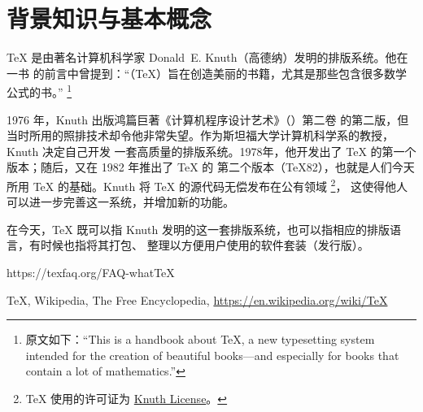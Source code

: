 %
%
%
%

\section{背景知识与基本概念}
\label{sec:basic}


\TeX{} 是由著名计算机科学家 Donald~E. Knuth（高德纳）发明的排版系统。他在  一书
的前言中曾提到：“（\TeX{}）旨在创造美丽的书籍，尤其是那些包含很多数学公式的书。”
\footnote{原文如下：“This is a handbook about \TeX{}, a new typesetting system intended for the
creation of beautiful books---and especially for books that contain a lot of mathematics.”}

1976 年，Knuth 出版鸿篇巨著《计算机程序设计艺术》（）第二卷
的第二版，但当时所用的照排技术却令他非常失望。作为斯坦福大学计算机科学系的教授，Knuth 决定自己开发
一套高质量的排版系统。1978年，他开发出了 \TeX{} 的第一个版本；随后，又在 1982 年推出了 \TeX{} 的
第二个版本（\TeX 82），也就是人们今天所用 \TeX{} 的基础。Knuth 将 \TeX{} 的源代码无偿发布在公有领域
\footnote{\TeX{} 使用的许可证为 \href{https://www.ctan.org/license/knuth}{Knuth License}。}，
这使得他人可以进一步完善这一系统，并增加新的功能。

在今天，\TeX{} 既可以指 Knuth 发明的这一套排版系统，也可以指相应的排版语言，有时候也指将其打包、
整理以方便用户使用的软件套装（发行版）。

\begin{reference}
  \item https://texfaq.org/FAQ-whatTeX
  \item \TeX{}, Wikipedia, The Free Encyclopedia, \url{https://en.wikipedia.org/wiki/TeX}
\end{reference}


